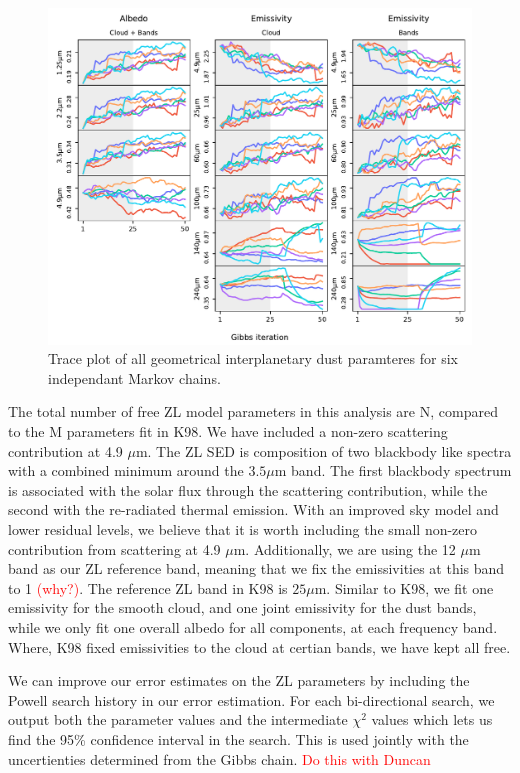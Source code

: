 \documentclass[twocolumn]{aa}
\begin{document}
\begin{figure}
    \centering
    \includegraphics[width=1\textwidth]{figs/emissivity_and_albedo_trace.pdf}
    \caption{Trace plot of all geometrical interplanetary dust paramteres for six independant Markov chains.}
    \label{fig:trace-emissivity-albedo}
\end{figure}
The total number of free ZL model parameters in this analysis are N, 
compared to the M parameters fit in K98. We have included a non-zero
scattering contribution at 4.9 $\mu$m. The ZL SED is composition of two
blackbody like spectra with a combined minimum around the $3.5\mu$m band. The first
blackbody spectrum is associated with the solar flux through the scattering 
contribution, while the second with the re-radiated thermal emission. With an
improved sky model and lower residual levels, we believe that it is worth 
including the small non-zero contribution from scattering at 4.9 $\mu$m.
Additionally, we are using the 12 $\mu$m band as our ZL reference band, meaning
that we fix the emissivities at this band to 1 \textcolor{red}{(why?)}. The
reference ZL band in K98 is $25 \mu$m. Similar to K98, we fit one emissivity 
for the smooth cloud, and one joint emissivity for the dust bands, while we 
only fit one overall albedo for all components, at each frequency band. Where,
K98 fixed emissivities to the cloud at certian bands, we have kept all free.

We can improve our error estimates on the ZL parameters by including the 
Powell search history in our error estimation. For each bi-directional 
search, we output both the parameter values and the intermediate $\chi^2$
values which lets us find the 95\% confidence interval in the search. This
is used jointly with the uncertienties determined from the Gibbs chain.
\textcolor{red}{Do this with Duncan}
\end{document}

